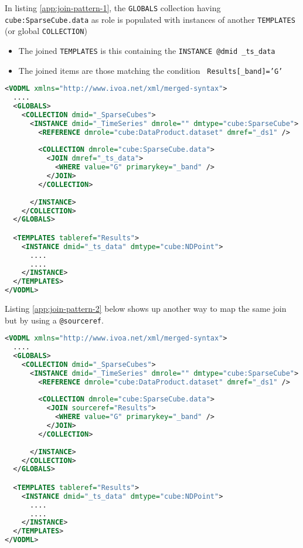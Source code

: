 
In listing \ref{app:join-pattern-1}, the \texttt{GLOBALS} collection having \texttt{cube:SparseCube.data} as role is populated with  instances of another \texttt{TEMPLATES} (or global \texttt{COLLECTION})
\begin{itemize}
  \item The joined \texttt{TEMPLATES} is this containing the  \texttt{INSTANCE \texttt{@dmid} \_ts\_data}
  \item The joined items are those matching the condition  \texttt{ Results[\_band]='G'}
\end{itemize}

\begin{lstlisting}[label={app:join-pattern-1},caption={Joining a global \texttt{COLLECTION} with a \texttt{TEMPLATES}  identified by a \texttt{@dmid} \texttt{@dmref} pair},language=XML]
<VODML xmlns="http://www.ivoa.net/xml/merged-syntax">
  ....
  <GLOBALS>
    <COLLECTION dmid="_SparseCubes">
      <INSTANCE dmid="_TimeSeries" dmrole="" dmtype="cube:SparseCube">
        <REFERENCE dmrole="cube:DataProduct.dataset" dmref="_ds1" />
        
        <COLLECTION dmrole="cube:SparseCube.data">
          <JOIN dmref="_ts_data">
            <WHERE value="G" primarykey="_band" />
          </JOIN>
        </COLLECTION>
        
      </INSTANCE>
    </COLLECTION>
  </GLOBALS>

  <TEMPLATES tableref="Results">
    <INSTANCE dmid="_ts_data" dmtype="cube:NDPoint">
      ....
      ....
    </INSTANCE>
  </TEMPLATES>
</VODML>
\end{lstlisting}  

Listing \ref{app:join-pattern-2} below shows up another way to map the same join but by using a \texttt{@sourceref}.

\begin{lstlisting}[label={app:join-pattern-2},caption={Joining a global \texttt{COLLECTION} with a \texttt{TEMPLATES}  identified by a @sourceref},language=XML]
<VODML xmlns="http://www.ivoa.net/xml/merged-syntax">
  ....
  <GLOBALS>
    <COLLECTION dmid="_SparseCubes">
      <INSTANCE dmid="_TimeSeries" dmrole="" dmtype="cube:SparseCube">
        <REFERENCE dmrole="cube:DataProduct.dataset" dmref="_ds1" />
        
        <COLLECTION dmrole="cube:SparseCube.data">
          <JOIN sourceref="Results">
            <WHERE value="G" primarykey="_band" />
          </JOIN>
        </COLLECTION>
        
      </INSTANCE>
    </COLLECTION>
  </GLOBALS>

  <TEMPLATES tableref="Results">
    <INSTANCE dmid="_ts_data" dmtype="cube:NDPoint">
      ....
      ....
    </INSTANCE>
  </TEMPLATES>
</VODML>
\end{lstlisting}  

